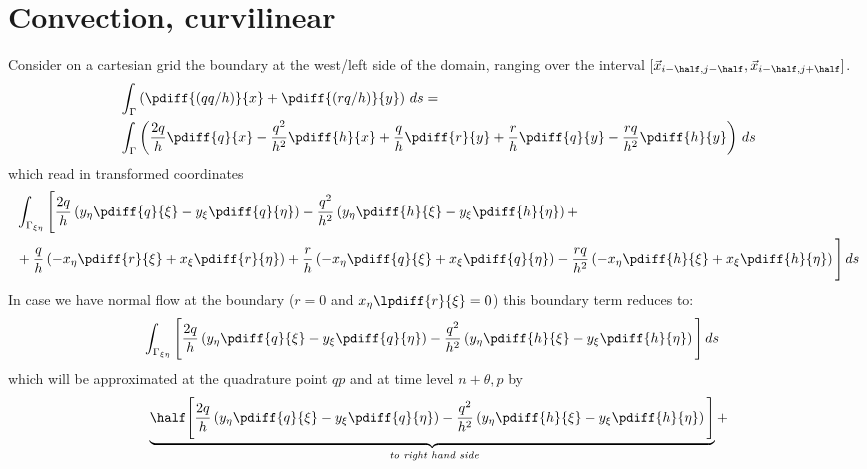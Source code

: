{{    \section{Convection, curvilinear}
        Consider on a cartesian grid the boundary at the west/left side of the domain, ranging over the interval $\left[ \vec{x}_{i-\half, j-\half}, \vec{x}_{i-\half, j+\half} \right]$.
        \begin{align}
            &\int_\Gamma\left(
            \pdiff{(qq/h)}{x}  + \pdiff{(rq/h)}{y}
            \right) \, ds
            =
            \\
            &\int_\Gamma\left(  \frac{2q}{h}\pdiff{q}{x} - \frac{q^2}{h^2}\pdiff{h}{x}  + \frac{q}{h}\pdiff{r}{y} + \frac{r}{h}\pdiff{q}{y} - \frac{rq}{h^2} \pdiff{h}{y} \right) \, ds
        \end{align}
        which read in transformed coordinates
        \begin{align}
            &\int_{\Gamma_{\xi\eta}} \Bigg[
            \frac{2q}{h}   \left( y_\eta \pdiff{q}{\xi} - y_\xi \pdiff{q}{\eta} \right)
            - \frac{q^2}{h^2}\left( y_\eta \pdiff{h}{\xi} - y_\xi \pdiff{h}{\eta} \right) +
            \\
            &+ \frac{q}{h}    \left( -x_\eta \pdiff{r}{\xi} + x_\xi \pdiff{r}{\eta} \right)
            + \frac{r}{h}    \left( -x_\eta \pdiff{q}{\xi} + x_\xi \pdiff{q}{\eta}  \right)
            - \frac{rq}{h^2} \left( -x_\eta \pdiff{h}{\xi} + x_\xi \pdiff{h}{\eta}  \right) \Bigg]\, ds
        \end{align}
        In case we have normal flow at the boundary ($r=0$ and $x_\eta \lpdiff{r}{\xi}=0$) this boundary term reduces to:
        \begin{align}
            &\int_{\Gamma_{\xi\eta}} \Bigg[
            \frac{2q}{h}   \left( y_\eta \pdiff{q}{\xi} - y_\xi \pdiff{q}{\eta} \right)
            - \frac{q^2}{h^2}\left( y_\eta \pdiff{h}{\xi} - y_\xi \pdiff{h}{\eta} \right)
            \Bigg]\, ds
        \end{align}
        which will be approximated at the quadrature point $qp$ and at time level ${n+\theta, p}$ by
        \begin{align}
            & \underbrace{\half \Bigg[
                \frac{2q}{h}
                \left( y_\eta \pdiff{q}{\xi} - y_\xi \pdiff{q}{\eta}  \right)
                - \frac{q^2}{h^2}
                \left(  y_\eta \pdiff{h}{\xi} - y_\xi \pdiff{h}{\eta}  \right)
                \Bigg]}_{\textit{ to right hand side}} +
            \\*

\end{align}}}
